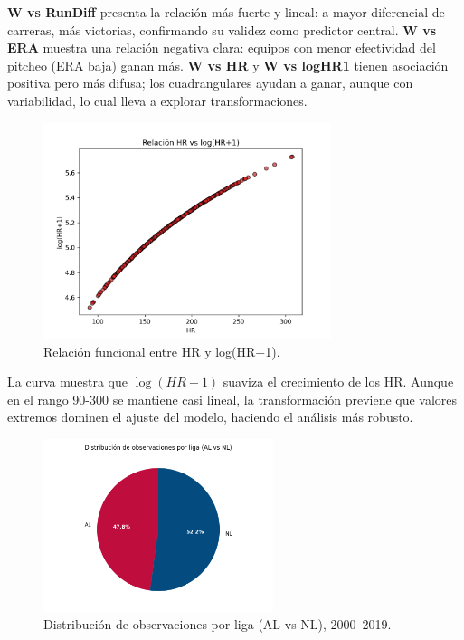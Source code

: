 \documentclass[man,floatsintext]{apa7}
\begin{document}
\textbf{W vs RunDiff} presenta la relación más fuerte y lineal: a mayor diferencial de carreras, más victorias, confirmando su validez como predictor central.  
\textbf{W vs ERA} muestra una relación negativa clara: equipos con menor efectividad del pitcheo (ERA baja) ganan más.  
\textbf{W vs HR} y \textbf{W vs logHR1} tienen asociación positiva pero más difusa; los cuadrangulares ayudan a ganar, aunque con variabilidad, lo cual lleva a explorar transformaciones.

\begin{figure}[H]
    \centering
    \includegraphics[width=0.75\textwidth]{../plots/scatter_HR_logHR1.png}
    \caption{Relación funcional entre HR y log(HR+1).}
\end{figure}

La curva muestra que $\log(HR+1)$ suaviza el crecimiento de los HR. 
Aunque en el rango 90-300 se mantiene casi lineal, la transformación previene que valores extremos dominen el ajuste del modelo, haciendo el análisis más robusto.

\begin{figure}[H]
    \centering
    \includegraphics[width=0.6\textwidth]{../plots/pie_ligas_colored.png}
    \caption{Distribución de observaciones por liga (AL vs NL), 2000--2019.}
\end{figure}
\end{document}
